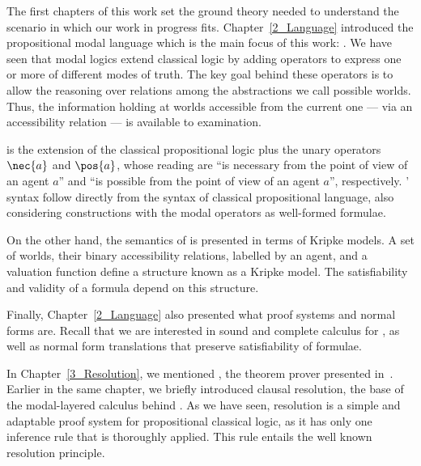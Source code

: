 
The first chapters of this work set the ground theory needed to understand the
scenario in which our work in progress fits. Chapter~\ref{2_Language}
introduced the propositional modal language which is the main focus of this
work: . We have seen that modal logics extend classical logic by
adding operators to express one or more of different modes of truth.  The key
goal behind these operators is to allow the reasoning over relations among the
abstractions we call possible worlds. Thus, the information holding at worlds
accessible from the current one --- via an accessibility relation --- is
available to examination.  

 is the extension of the classical propositional logic plus the
unary operators $\nec{a}$ and $\pos{a}$, whose reading are ``is necessary from
the point of view of an agent $a$'' and ``is possible from the point of view of
an agent $a$'', respectively. ' syntax follow directly from the
syntax of classical propositional language, also considering constructions with
the modal operators as well-formed formulae.

On the other hand, the semantics of  is presented in terms of
Kripke models. A set of worlds, their binary accessibility relations, labelled
by an agent, and a valuation function define a structure known as a Kripke
model. The satisfiability and validity of a formula depend on this
structure.

Finally, Chapter~\ref{2_Language} also presented what proof systems and normal
forms are. Recall that we are interested in sound and complete calculus for
, as well as normal form translations that preserve
satisfiability of formulae.

In Chapter~\ref{3_Resolution}, we mentioned \ksp, the theorem prover presented
in~\cite{Nalon2016}. Earlier in the same chapter, we briefly introduced clausal
resolution, the base of the modal-layered calculus behind \ksp. As we have seen,
resolution is a simple and adaptable proof system for propositional classical
logic, as it has only one inference rule that is thoroughly applied. This rule
entails the well known resolution principle.

